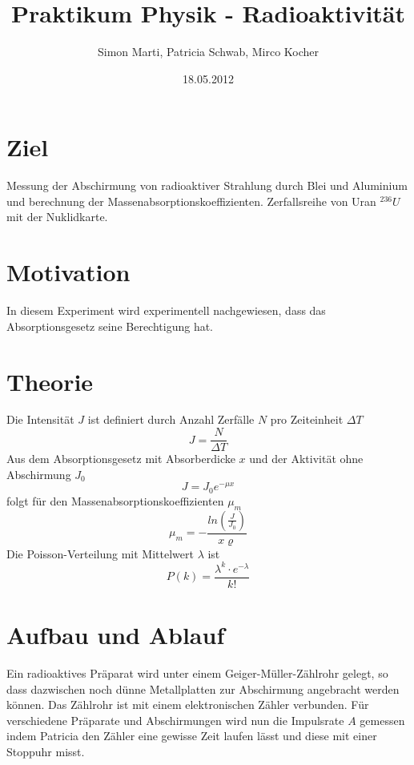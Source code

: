 \documentclass[12pt,a4paper]{article}
\title{Praktikum Physik - Radioaktivität}
\author{Simon Marti, Patricia Schwab, Mirco Kocher}
\date{18.05.2012}
\begin{document}
\maketitle

\section*{Ziel}
Messung der Abschirmung von radioaktiver Strahlung durch Blei und Aluminium und berechnung der Massenabsorptionskoeffizienten. Zerfallsreihe von Uran $^{236}U$ mit der Nuklidkarte.

\section*{Motivation}
In diesem Experiment wird experimentell nachgewiesen, dass das Absorptionsgesetz seine Berechtigung hat.

\section*{Theorie}
Die Intensit\"at $J$ ist definiert durch Anzahl Zerf\"alle $N$ pro Zeiteinheit $\Delta T$
\begin{equation}
J =\frac{N}{\Delta T}
\end{equation}
Aus dem Absorptionsgesetz mit Absorberdicke $x$ und der Aktivit\"at ohne Abschirmung $J_0$
\begin{equation}
J = J_0 e^{-\mu x}
\end{equation}
folgt f\"ur den Massenabsorptionskoeffizienten $\mu_m$
\begin{equation}
\mu_m = - \frac{ln(\frac{J}{J_0})}{x \varrho}
\end{equation}
Die Poisson-Verteilung mit Mittelwert $\lambda$ ist
\begin{equation}
P(k) = \frac{\lambda^k \cdot e^{-\lambda}}{k!}
\end{equation}


\section*{Aufbau und Ablauf}
Ein radioaktives Präparat wird unter einem Geiger-Müller-Zählrohr gelegt, so dass dazwischen noch dünne Metallplatten zur Abschirmung angebracht werden können. Das Zählrohr ist mit einem elektronischen Zähler verbunden. Für verschiedene Präparate und Abschirmungen wird nun die Impulsrate $A$ gemessen indem Patricia den Zähler eine gewisse Zeit laufen lässt und diese mit einer Stoppuhr misst.
\end{document}
